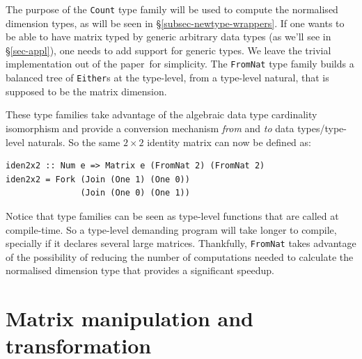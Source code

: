 \documentclass[sigplan]{acmart}\settopmatter{}
\newcommand{\hs}{\texttt}
\def\doc{paper}
\begin{document}
The purpose of the \hs{Count} type family will be used to compute the normalised dimension types, as will be seen in \S\ref{subsec-newtype-wrappers}. If one wants to be able to have matrix typed by generic arbitrary data types (as we'll see in \S\ref{sec-appl}), one needs to add support for generic types. We leave the trivial implementation out of the \doc\ for simplicity. The \hs{FromNat} type family builds a balanced tree of \hs{Either}s at the type-level, from a type-level natural, that is supposed to be the matrix dimension.

These type families take advantage of the algebraic data type cardinality isomorphism and provide a conversion mechanism \emph{from} and \emph{to} data types/type-level naturals. So the same $2 \times 2$ identity matrix can now be defined as:

\vspace{1mm}
\begin{verbatim}
iden2x2 :: Num e => Matrix e (FromNat 2) (FromNat 2)
iden2x2 = Fork (Join (One 1) (One 0)) 
               (Join (One 0) (One 1))
\end{verbatim}
\vspace{1mm}

Notice that type families can be seen as type-level functions that are called at compile-time. So a type-level demanding program will take longer to compile, specially if it declares several large matrices. Thankfully, \hs{FromNat} takes advantage of the possibility of reducing the number of computations needed to calculate the normalised dimension type that provides a significant speedup.

\section{Matrix manipulation and transformation} \label{sec:200303a}
\end{document}
